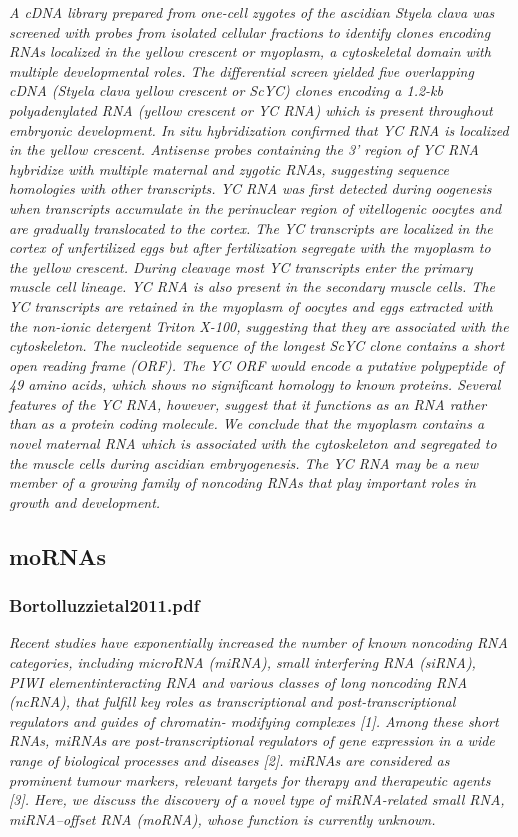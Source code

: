 \documentclass[graybox]{svmult}
\begin{document}
\cite{Swalla1995}
\textit{A cDNA library prepared from one-cell zygotes of the ascidian Styela 
clava was screened with probes from isolated cellular fractions to identify 
clones encoding RNAs localized in the yellow crescent or myoplasm, a 
cytoskeletal domain with multiple developmental roles. The differential screen 
yielded five overlapping cDNA (Styela clava yellow crescent or ScYC) clones 
encoding a 1.2-kb polyadenylated RNA (yellow crescent or YC RNA) which is 
present throughout embryonic development. In situ hybridization confirmed that 
YC RNA is localized in the yellow crescent. Antisense probes containing the 3' 
region of YC RNA hybridize with multiple maternal and zygotic RNAs, suggesting 
sequence homologies with other transcripts. YC RNA was first detected during 
oogenesis when transcripts accumulate in the perinuclear region of vitellogenic 
oocytes and are gradually translocated to the cortex. The YC transcripts are 
localized in the cortex of unfertilized eggs but after fertilization segregate 
with the myoplasm to the yellow crescent. During cleavage most YC transcripts 
enter the primary muscle cell lineage. YC RNA is also present in the secondary 
muscle cells. The YC transcripts are retained in the myoplasm of oocytes and 
eggs extracted with the non-ionic detergent Triton X-100, suggesting that they 
are associated with the cytoskeleton. The nucleotide sequence of the longest 
ScYC clone contains a short open reading frame (ORF). The YC ORF would encode a 
putative polypeptide of 49 amino acids, which shows no significant homology to 
known proteins. Several features of the YC RNA, however, suggest that it 
functions as an RNA rather than as a protein coding molecule. We conclude that 
the myoplasm contains a novel maternal RNA which is associated with the 
cytoskeleton and segregated to the muscle cells during ascidian embryogenesis. 
The YC RNA may be a new member of a growing family of noncoding RNAs that play 
important roles in growth and development.}

\subsection{moRNAs}
\subsubsection{Bortolluzzietal2011.pdf}
\cite{Bortoluzzi2011a}
\textit{Recent studies have exponentially increased the number of
known noncoding RNA categories, including microRNA
(miRNA), small interfering RNA (siRNA), PIWI elementinteracting
RNA and various classes of long noncoding
RNA (ncRNA), that fulfill key roles as transcriptional
and post-transcriptional regulators and guides of chromatin-
modifying complexes [1]. Among these short RNAs,
miRNAs are post-transcriptional regulators of gene expression
in a wide range of biological processes and diseases
[2]. miRNAs are considered as prominent tumour
markers, relevant targets for therapy and therapeutic
agents [3]. Here, we discuss the discovery of a novel type
of miRNA-related small RNA, miRNA–offset RNA
(moRNA), whose function is currently unknown.}
\end{document}
